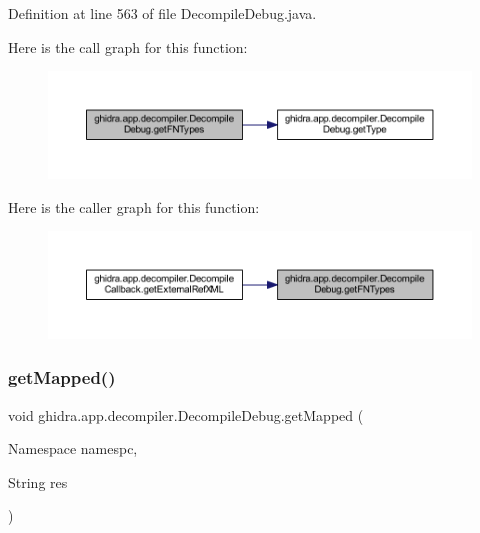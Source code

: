 Definition at line 563 of file Decompile\+Debug.\+java.

Here is the call graph for this function\+:
\nopagebreak
\begin{figure}[H]
\begin{center}
\leavevmode
\includegraphics[width=350pt]{classghidra_1_1app_1_1decompiler_1_1_decompile_debug_a776b1bd42991b6e34f93bc0fc3dff45f_cgraph}
\end{center}
\end{figure}
Here is the caller graph for this function\+:
\nopagebreak
\begin{figure}[H]
\begin{center}
\leavevmode
\includegraphics[width=350pt]{classghidra_1_1app_1_1decompiler_1_1_decompile_debug_a776b1bd42991b6e34f93bc0fc3dff45f_icgraph}
\end{center}
\end{figure}
\mbox{\label{classghidra_1_1app_1_1decompiler_1_1_decompile_debug_abb217fc29ef7820e2f5537d44f33617f}} 
\subsubsection{\texorpdfstring{getMapped()}{getMapped()}}
{\footnotesize\ttfamily void ghidra.\+app.\+decompiler.\+Decompile\+Debug.\+get\+Mapped (\begin{DoxyParamCaption}\item[{Namespace}]{namespc,  }\item[{String}]{res }\end{DoxyParamCaption})\hspace{0.3cm}{\ttfamily [inline]}}



